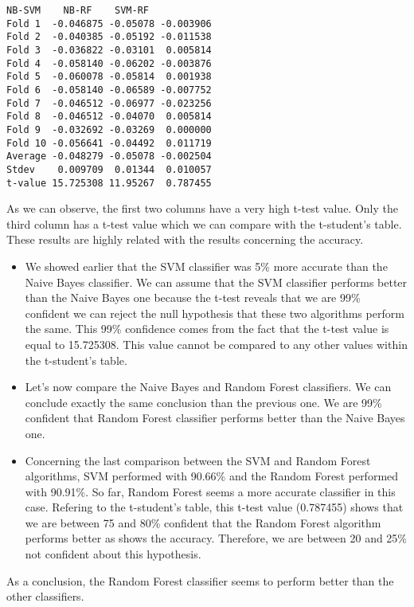\documentclass[]{article}
\begin{document}
\begin{lstlisting}[frame=single]
           NB-SVM    NB-RF    SVM-RF
Fold 1  -0.046875 -0.05078 -0.003906
Fold 2  -0.040385 -0.05192 -0.011538
Fold 3  -0.036822 -0.03101  0.005814
Fold 4  -0.058140 -0.06202 -0.003876
Fold 5  -0.060078 -0.05814  0.001938
Fold 6  -0.058140 -0.06589 -0.007752
Fold 7  -0.046512 -0.06977 -0.023256
Fold 8  -0.046512 -0.04070  0.005814
Fold 9  -0.032692 -0.03269  0.000000
Fold 10 -0.056641 -0.04492  0.011719
Average -0.048279 -0.05078 -0.002504
Stdev    0.009709  0.01344  0.010057
t-value 15.725308 11.95267  0.787455
\end{lstlisting}

As we can observe, the first two columns have a very high t-test value. Only the third column has a t-test value which we can compare with the t-student's table.
These results are highly related with the results concerning the accuracy.
\begin{itemize}
\item We showed earlier that the SVM classifier was 5\% more accurate than the Naive Bayes classifier. We can assume that the SVM classifier performs better than the Naive Bayes one because the t-test reveals that we are 99\% confident we can reject the null hypothesis that these two algorithms perform the same. This 99\% confidence comes from the fact that the t-test value is equal to 15.725308. This value cannot be compared to any other values within the t-student's table.
\item Let's now compare the Naive Bayes and Random Forest classifiers. We can conclude exactly the same conclusion than the previous one. We are 99\% confident that Random Forest classifier performs better than the Naive Bayes one.
\item Concerning the last comparison between the SVM and Random Forest algorithms, SVM performed with 90.66\% and the Random Forest performed with 90.91\%. So far, Random Forest seems a more accurate classifier in this case. Refering to the t-student's table, this t-test value (0.787455) shows that we are between 75 and 80\% confident that the Random Forest algorithm performs better as shows the accuracy. Therefore, we are between 20 and 25\% not confident about this hypothesis.
\end{itemize}

As a conclusion, the Random Forest classifier seems to perform better than the other classifiers.
\end{document}
